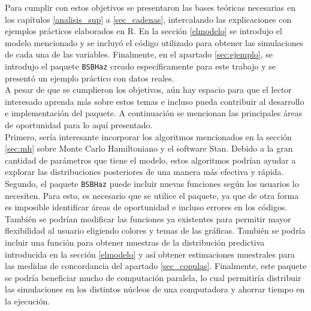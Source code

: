 \documentclass[11pt,a4paper]{article}
\begin{document}
Para cumplir con estos objetivos se presentaron las bases teóricas necesarias en los capítulos \ref{analisis_sup} a \ref{sec_cadenas}, intercalando las explicaciones con ejemplos prácticos elaborados en R. En la sección \ref{elmodelo} se introdujo el modelo mencionado y se incluyó el código utilizado para obtener las simulaciones de cada una de las variables. Finalmente, en el apartado \ref{sec:ejemplo}, se introdujo el paquete \texttt{BSBHaz} creado específicamente para este trabajo y se presentó un ejemplo práctico con datos reales.\\

A pesar de que se cumplieron los objetivos, aún hay espacio para que el lector interesado aprenda más sobre estos temas e incluso pueda contribuir al desarrollo e implementación del paquete. A continuación se mencionan las principales áreas de oportunidad para lo aquí presentado.\\

Primero, sería interesante incorporar los algoritmos mencionados en la sección \ref{sec:mh} sobre Monte Carlo Hamiltoniano y el software Stan. Debido a la gran cantidad de parámetros que tiene el modelo, estos algoritmos podrían ayudar a explorar las distribuciones posteriores de una manera más efectiva y rápida.\\

Segundo, el paquete \texttt{BSBHaz} puede incluir nuevas funciones según los usuarios lo necesiten. Para esto, es necesario que se utilice el paquete, ya que de otra forma es imposible identificar áreas de oportunidad e incluso errores en los códigos. También se podrían modificar las funciones ya existentes para permitir mayor flexibilidad al usuario eligiendo colores y temas de las gráficas. También se podría incluir una función para obtener muestras de la distribución predictiva introducida en la sección \ref{elmodelo} y así obtener estimaciones muestrales para las medidas de concordancia del apartado \ref{sec_copulas}. Finalmente, este paquete se podría beneficiar mucho de computación paralela, lo cual permitiría distribuir las simulaciones en los distintos núcleos de una computadora y ahorrar tiempo en la ejecución.\\
\end{document}
